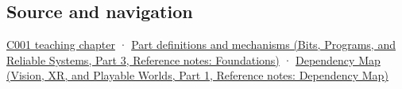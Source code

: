 \subsection{Source and navigation}\label{appendix-83c3f28f7bda-source-and-navigation}

\hypertarget{appendix-83c3f28f7bda-source-and-navigation}{}

\hyperref[01-foundations-i-ch001-from-a-signal-to-an-interpretation]{C001 teaching chapter} · \href{../01-Bits-Programs-and-Reliable-Systems-P03/main.pdf\#appendix-fd090d982a15}{Part definitions and mechanisms (Bits, Programs, and Reliable Systems, Part 3, Reference notes: Foundations)} · \href{../07-Vision-XR-and-Playable-Worlds-P01/main.pdf\#appendix-4ad47bdd269a}{Dependency Map (Vision, XR, and Playable Worlds, Part 1, Reference notes: Dependency Map)}
